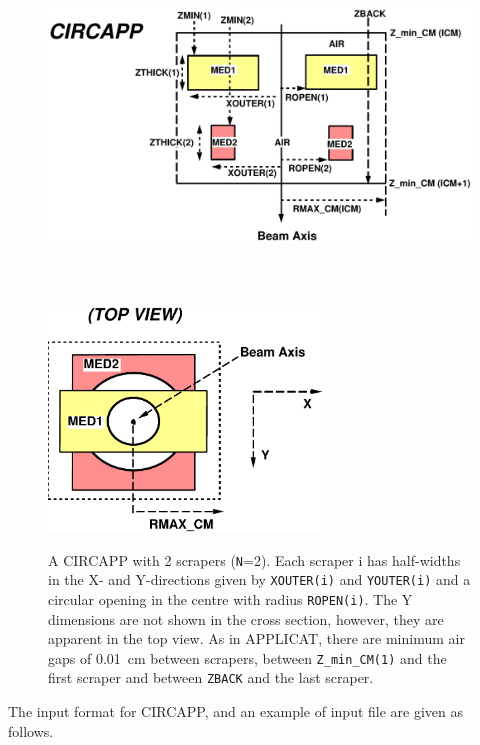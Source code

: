 \documentclass[12pt,twoside]{article}
\begin{document}
\begin{figure}[htp]
\begin{center}
\leavevmode
\includegraphics[height=9.25cm]{figures/circappd}
\end{center}
\vspace{-1.6cm}
\includegraphics[height=6cm]{figures/circapptop}
\caption[CIRCAPP CM geometry]
{A CIRCAPP with 2 scrapers ({\tt N}=2).  Each scraper i has half-widths in the
X- and Y-directions given by {\tt XOUTER(i)} and {\tt YOUTER(i)} and a
circular opening in the centre with radius {\tt ROPEN(i)}.
The Y dimensions are not shown in the cross section, however, they
are apparent in the top view.  As in APPLICAT, there are minimum air gaps
of 0.01~cm between scrapers, between {\tt Z\_min\_CM(1)} and the first scraper
and between {\tt ZBACK} and the last scraper.}
\label{fig_CIRCAPPD}
\end{figure}

\clearpage

The input format for CIRCAPP, and an example of input file are given as follows.
\end{document}
